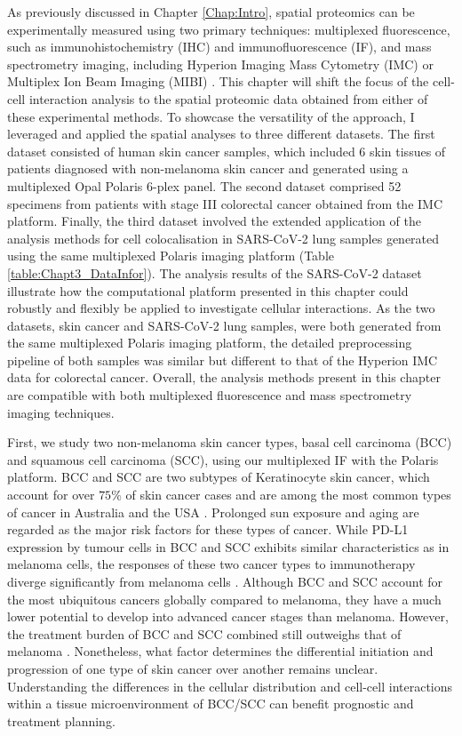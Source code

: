 As previously discussed in Chapter \ref{Chap:Intro}, spatial proteomics can be experimentally measured using two primary techniques: multiplexed fluorescence, such as immunohistochemistry (IHC) and immunofluorescence (IF), and mass spectrometry imaging, including Hyperion Imaging Mass Cytometry (IMC) or Multiplex Ion Beam Imaging (MIBI) \cite{hoyt2021multiplex, baharlou2019mass}. This chapter will shift the focus of the cell-cell interaction analysis to the spatial proteomic data obtained from either of these experimental methods. To showcase the versatility of the approach, I leveraged and applied the spatial analyses to three different datasets. The first dataset consisted of human skin cancer samples, which included 6 skin tissues of patients diagnosed with non-melanoma skin cancer and generated using a multiplexed Opal Polaris 6-plex panel. The second dataset comprised 52 specimens from patients with stage III  colorectal cancer obtained from the IMC platform. Finally, the third dataset involved the extended application of the analysis methods for cell colocalisation in SARS-CoV-2 lung samples generated using the same multiplexed Polaris imaging platform (Table \ref{table:Chapt3_DataInfor}). The analysis results of the SARS-CoV-2 dataset illustrate how the computational platform presented in this chapter could robustly and flexibly be applied to investigate cellular interactions. As the two datasets, skin cancer and SARS-CoV-2 lung samples, were both generated from the same multiplexed Polaris imaging platform, the detailed preprocessing pipeline of both samples was similar but different to that of the Hyperion IMC data for colorectal cancer. Overall, the analysis methods present in this chapter are compatible with both multiplexed fluorescence and mass spectrometry imaging techniques. 

First, we study two non-melanoma skin cancer types, basal cell carcinoma (BCC) and squamous cell carcinoma (SCC), using our multiplexed IF with the Polaris platform. BCC and SCC are two subtypes of Keratinocyte skin cancer, which account for over $75\%$ of skin cancer cases and are among the most common types of cancer in Australia and the USA \cite{rogers2015incidence, thomas2021interpretable}. Prolonged sun exposure and aging are regarded as the major risk factors for these types of cancer. While PD-L1 expression by tumour cells in BCC and SCC exhibits similar characteristics as in melanoma cells, the responses of these two cancer types to immunotherapy diverge significantly from melanoma cells \cite{stonesifer2021immune}. Although BCC and SCC account for the most ubiquitous cancers globally compared to melanoma, they have a much lower potential to develop into advanced cancer stages than melanoma. However, the treatment burden of BCC and SCC combined still outweighs that of melanoma \cite{stonesifer2021immune, leiter2020epidemiology}. Nonetheless, what factor determines the differential initiation and progression of one type of skin cancer over another remains unclear. Understanding the differences in the cellular distribution and cell-cell interactions within a tissue microenvironment of BCC/SCC can benefit prognostic and treatment planning. 

